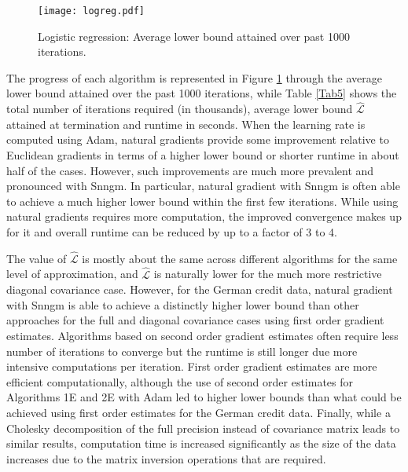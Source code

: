 \documentclass{statsoc}
\newcommand\mL{{\mathcal{L}}}
\begin{document}
\begin{figure}[htb!]
\centering 
\texttt{[image: logreg.pdf]}
\caption{Logistic regression: Average lower bound attained over past 1000 iterations.}
\label{Fig3}
\end{figure}

The progress of each algorithm is represented in Figure \ref{Fig3} through the average lower bound attained over the past 1000 iterations, while Table \ref{Tab5} shows the total number of iterations required (in thousands), average lower bound $\hat{\mL}$ attained at termination and runtime in seconds. When the learning rate is computed using Adam, natural gradients provide some improvement relative to Euclidean gradients in terms of a higher lower bound or shorter runtime in about half of the cases. However, such improvements are much more prevalent and pronounced with Snngm. In particular, natural gradient with Snngm is often able to achieve a much higher lower bound within the first few iterations. While using natural gradients requires more computation, the improved convergence makes up for it and overall runtime can be reduced by up to a factor of 3 to 4.

The value of $\hat{\mL}$ is mostly about the same across different algorithms for the same level of approximation, and $\hat{\mL}$ is naturally lower for the much more restrictive diagonal covariance case. However, for the German credit data, natural gradient with Snngm is able to achieve a distinctly higher lower bound than other approaches for the full and diagonal covariance cases using first order gradient estimates. Algorithms based on second order gradient estimates often require less number of iterations to converge but the runtime is still longer due more intensive computations per iteration. First order gradient estimates are more efficient computationally, although the use of second order estimates for Algorithms 1E and 2E with Adam led to higher lower bounds than what could be achieved using first order estimates for the German credit data. Finally, while a Cholesky decomposition of the full precision instead of covariance matrix leads to similar results, computation time is increased significantly as the size of the data increases due to the matrix inversion operations that are required.
\end{document}

